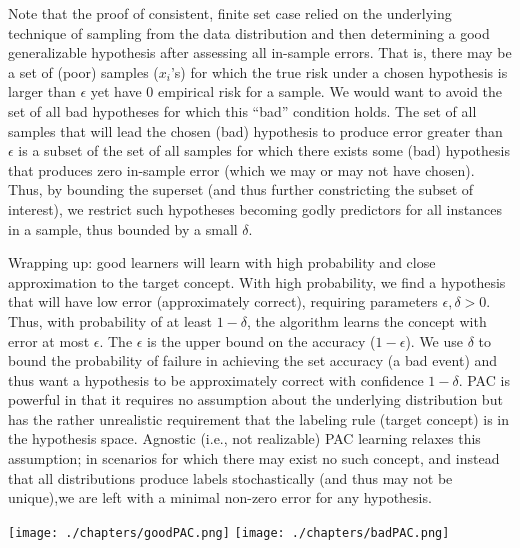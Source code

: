 Note that the proof of consistent, finite set case relied on the underlying
technique of sampling from the
data distribution and then determining a good generalizable hypothesis after
assessing all in-sample errors. That is,
there may be a set of (poor) samples ($x_i$'s) for which the true risk under a
chosen hypothesis is larger than $\epsilon$ yet have 0 empirical risk for a
sample. We would want to avoid the set of
all bad hypotheses
for which this ``bad'' condition holds. The set of all
samples that will lead the
chosen (bad) hypothesis to produce error greater than $\epsilon$ is a subset of
the set of all samples for which there exists some (bad) hypothesis that
produces zero in-sample error (which we may or may not have chosen). Thus, by
bounding the
superset (and thus further constricting the subset of interest), we restrict
such hypotheses becoming godly predictors for all instances in a sample, thus
bounded by a small $\delta$.\par
Wrapping up: good learners will learn with high probability and close
approximation to the
target concept. With high probability, we find a hypothesis that will have low
error (approximately correct), requiring parameters $\epsilon, \delta > 0$.
Thus, with probability of at least $1-\delta$, the algorithm learns the concept
with error at most $\epsilon$. The $\epsilon$ is the upper bound on the
accuracy ($1-\epsilon$). We use $\delta$ to bound the probability of failure in
achieving the set accuracy (a bad event) and thus want a hypothesis to be
approximately correct with confidence $1-\delta$. PAC is powerful in that it
requires no assumption about
the underlying distribution but has the rather unrealistic requirement that the
labeling rule (target concept)
is in the hypothesis space. Agnostic (i.e., not realizable) PAC learning
relaxes this assumption; in scenarios for which there may exist no such
concept,
and instead that all distributions produce labels stochastically (and thus may
not be unique),we are left with a minimal non-zero
error for any hypothesis.\par

\centering
\texttt{[image: ./chapters/goodPAC.png]}
\texttt{[image: ./chapters/badPAC.png]}